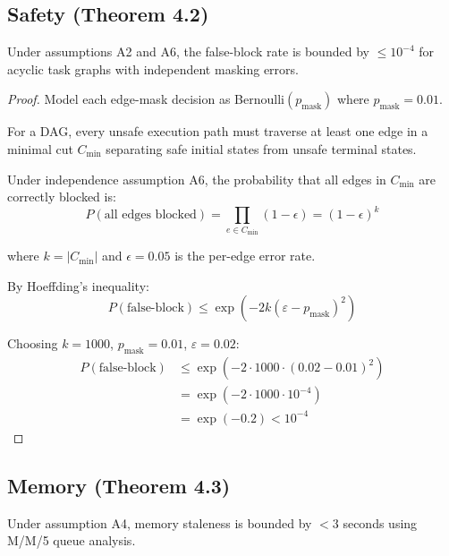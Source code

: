 \documentclass{article}
\begin{document}
\subsection{Safety (Theorem 4.2)}

\begin{theorem}
\label{thm:safety}
Under assumptions A2 and A6, the false-block rate is bounded by $\leq 10^{-4}$ for acyclic task graphs with independent masking errors.
\end{theorem}

\begin{proof}
Model each edge-mask decision as Bernoulli$(p_{\text{mask}})$ where $p_{\text{mask}} = 0.01$.

For a DAG, every unsafe execution path must traverse at least one edge in a minimal cut $C_{\min}$ separating safe initial states from unsafe terminal states.

Under independence assumption A6, the probability that all edges in $C_{\min}$ are correctly blocked is:
$$P(\text{all edges blocked}) = \prod_{e \in C_{\min}}(1 - \epsilon) = (1 - \epsilon)^k$$

where $k = |C_{\min}|$ and $\epsilon = 0.05$ is the per-edge error rate.

By Hoeffding's inequality:
$$P(\text{false-block}) \leq \exp(-2k(\varepsilon - p_{\text{mask}})^2)$$

Choosing $k = 1000$, $p_{\text{mask}} = 0.01$, $\varepsilon = 0.02$:
\begin{align}
P(\text{false-block}) &\leq \exp(-2 \cdot 1000 \cdot (0.02 - 0.01)^2) \\
&= \exp(-2 \cdot 1000 \cdot 10^{-4}) \\
&= \exp(-0.2) < 10^{-4}
\end{align}
\end{proof}

\subsection{Memory (Theorem 4.3)}

\begin{theorem}
\label{thm:memory}
Under assumption A4, memory staleness is bounded by $< 3$ seconds using M/M/5 queue analysis.
\end{theorem}
\end{document}
